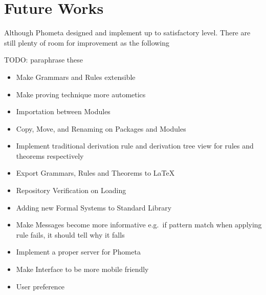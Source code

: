 \documentclass[master.tex]{subfiles}
\begin{document}
\section{Future Works}

Although Phometa designed and implement up to satisfactory level. There are
still plenty of room for improvement as the following

TODO: paraphrase these
\begin{itemize}
  \item Make Grammars and Rules extensible
  \item Make proving technique more autometics
  \item Importation between Modules
  \item Copy, Move, and Renaming on Packages and Modules
  \item Implement traditional derivation rule and derivation tree view for
    rules and theorems respectively
  \item Export Grammars, Rules and Theorems to \LaTeX\
  \item Repository Verification on Loading
  \item Adding new Formal Systems to Standard Library
  \item Make Messages become more informative
  e.g.\ if pattern match when applying rule fails, it should tell why it falls
  \item Implement a proper server for Phometa
  \item Make Interface to be more mobile friendly
  \item User preference
\end{itemize}
\end{document}
